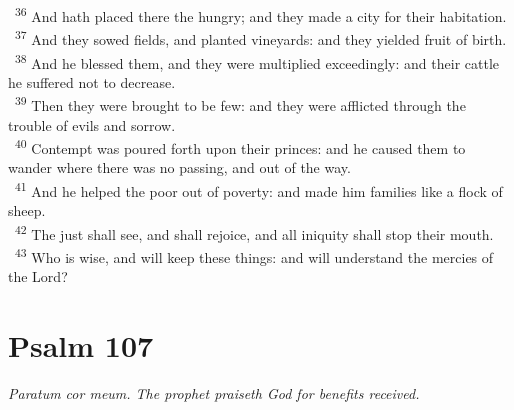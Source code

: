 \documentclass[a5paper,12pt]{article}
\begin{document}
\begin{multicols*}{2}
~\textsuperscript{36} And hath placed there the hungry; and they made a city for their habitation.\\
~\textsuperscript{37} And they sowed fields, and planted vineyards: and they yielded fruit of birth.\\
~\textsuperscript{38} And he blessed them, and they were multiplied exceedingly: and their cattle he suffered not to decrease.\\
~\textsuperscript{39} Then they were brought to be few: and they were afflicted through the trouble of evils and sorrow.\\
~\textsuperscript{40} Contempt was poured forth upon their princes: and he caused them to wander where there was no passing, and out of the way.\\
~\textsuperscript{41} And he helped the poor out of poverty: and made him families like a flock of sheep.\\
~\textsuperscript{42} The just shall see, and shall rejoice, and all iniquity shall stop their mouth.\\
~\textsuperscript{43} Who is wise, and will keep these things: and will understand the mercies of the Lord?\\

\section{Psalm 107}
\label{sec:org138b769}
\emph{Paratum cor meum. The prophet praiseth God for benefits received.}\\


\end{multicols*}
\end{document}
